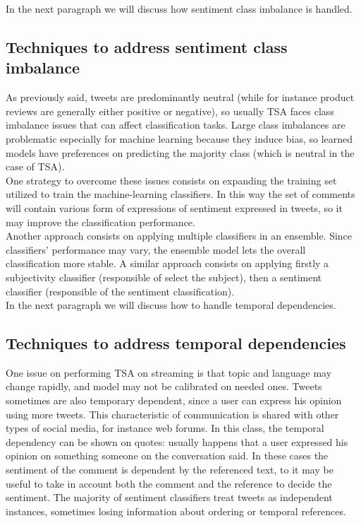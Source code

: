 In the next paragraph we will discuss how sentiment class imbalance is handled.\\


\subsection{Techniques to address sentiment class imbalance}

As previously said, tweets are predominantly neutral (while for instance product reviews are generally either positive or negative), so usually \ac{TSA} faces class imbalance issues that can affect classification tasks. Large class imbalances are problematic especially for machine learning because they induce bias, so learned models have preferences on predicting the majority class (which is neutral in the case of \ac{TSA}).\\
One strategy to overcome these issues consists on expanding the training set utilized to train the machine-learning classifiers. In this way the set of comments will contain various form of expressions of sentiment expressed in tweets, so it may improve the classification performance.\\
Another approach consists on applying multiple classifiers in an ensemble. Since classifiers' performance may vary, the ensemble model lets the overall classification more stable. A similar approach consists on applying firstly a subjectivity classifier (responsible of select the subject), then a sentiment classifier (responsible of the sentiment classification).\\

In the next paragraph we will discuss how to handle temporal dependencies.


\subsection{Techniques to address temporal dependencies}

One issue on performing \ac{TSA} on streaming is that topic and language may change rapidly, and model may not be calibrated on needed ones. Tweets sometimes are also temporary dependent, since a user can express his opinion using more tweets. This characteristic of communication is shared with other types of social media, for instance web forums. In this class, the temporal dependency can be shown on quotes: usually happens that a user expressed his opinion on something someone on the conversation said. In these cases the sentiment of the comment is dependent by the referenced text, to it may be useful to take in account both the comment and the reference to decide the sentiment. The majority of sentiment classifiers treat tweets as independent instances, sometimes losing information about ordering or temporal references.



